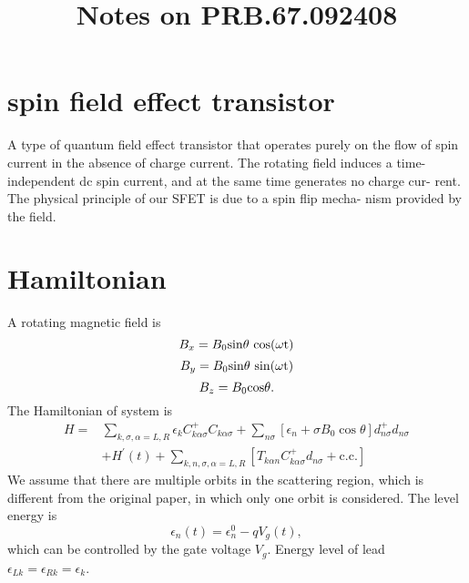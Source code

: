 \documentclass[11pt,a4paper]{article}
\begin{document}
\title{Notes on PRB.67.092408}
\date{}
\maketitle

\section{spin field effect transistor}
A type of quantum field effect transistor that operates purely on the flow of spin current in the absence of charge current. The rotating field induces a time-independent dc spin current, and at the same time generates no charge cur- rent. The physical principle of our SFET is due to a spin flip mecha- nism provided by the field.
\section{Hamiltonian}
A rotating magnetic field is
\begin{equation}
B_{x} = B_{0}\rm{sin}\theta ~\rm{cos}(\omega t)
\end{equation}
\begin{equation}
B_{y} = B_{0}\rm{sin}\theta~\rm{sin}(\omega t)
\end{equation}
\begin{equation}
B_{z} = B_{0}\rm{cos}\theta.
\end{equation}
The Hamiltonian of system is
\begin{equation}
\begin{split}
H=&\sum_{k, \sigma, \alpha=L, R} \epsilon_{k} C_{k \alpha \sigma}^{+} C_{k \alpha \sigma}+\sum_{n\sigma}\left[\epsilon_{n}+\sigma B_{0} \cos \theta\right] d_{n\sigma}^{+} d_{n\sigma}\\
&+H^{\prime}(t)+\sum_{k,n, \sigma, \alpha=L, R}\left[T_{k \alpha n} C_{k \alpha \sigma}^{+} d_{n\sigma}+\mathrm{c.c.}\right]
\end{split}
\end{equation}
We assume that there are multiple orbits in the scattering region, which is different from the original paper, in which only one orbit is considered. The level energy is
\begin{equation}
\epsilon_{n}(t) = \epsilon_{n}^{0} -qV_{g}(t),
\end{equation}
which can be controlled by the gate voltage $V_{g}$. Energy level of lead $\epsilon_{Lk} = \epsilon_{Rk} = \epsilon_{k}$.
\end{document}

